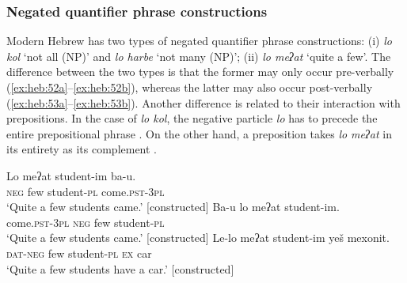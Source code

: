 \documentclass[output=paper,colorlinks,citecolor=brown]{langscibook}
\begin{document}
\subsubsection{Negated quantifier phrase constructions} \label{sec:heb:4.6.4}

Modern Hebrew has two types of negated quantifier phrase constructions: (i) \textit{lo kol} ‘not all (NP)’ and \textit{lo harbe} ‘not many (NP)’; (ii) \textit{lo meʔat} ‘quite a few’. The difference between the two types is that the former may only occur pre-verbally (\ref{ex:heb:52a}--\ref{ex:heb:52b}), whereas the latter may also occur post-verbally (\ref{ex:heb:53a}--\ref{ex:heb:53b}). Another difference is related to their interaction with prepositions. In the case of \textit{lo kol}, the negative particle \textit{lo} has to precede the entire prepositional phrase . On the other hand, a preposition takes \textit{lo meʔat} in its entirety as its complement .

\ea\label{ex:heb:52}
    \z 
\z

\ea\label{ex:heb:53}
    \ea\label{ex:heb:53a}
        \gll Lo meʔat student-im ba-u.\\
             \textsc{neg} few student-\textsc{pl} come.\textsc{pst-3pl}\\
        \glt ‘Quite a few students came.’ [constructed]
    \ex\label{ex:heb:53b}
        \gll Ba-u lo meʔat student-im.\\
             come.\textsc{pst-3pl} \textsc{neg} few student-\textsc{pl} \\
        \glt ‘Quite a few students came.’ [constructed]
    \ex\label{ex:heb:53c}
        \gll Le{}-lo meʔat student-im yeš mexonit.\\
             \textsc{dat}{}-\textsc{neg} few student-\textsc{pl} \textsc{ex} car\\
        \glt ‘Quite a few students have a car.’ [constructed]
    \z 
\z
\end{document}
